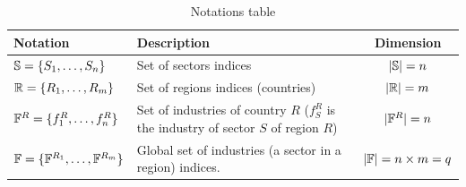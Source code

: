 {\renewcommand{\arraystretch}{1.3}%

  \begin{table}[H]
    \centering
    \caption{Notations table}
    \begin{tabularx}{\linewidth}{
      p{4.5cm}Xc
      }
      \textbf{Notation} & \textbf{Description} & \textbf{Dimension} \\\toprule
      $\mathbb{S}{} = \{ S_1, \ldots, S_n\}$ & Set of sectors indices & $|\mathbb{S}| = n$ \\
      $\mathbb{R} = \{ R_1, \ldots, R_m\}$ & Set of regions indices (countries) & $|\mathbb{R}| = m$ \\
      $\rfirmsset = \{f^R_1, \ldots,  f^R_n\}$ & Set of industries of country $R$ ($f^R_{S}$ is the industry of sector $S$ of region $R$) & $|\rfirmsset{}| = n$\\
      $\firmsset = \{\rfirmsset[R_1], \ldots, \rfirmsset[R_{m}]\}$ & Global set
                                                                     of
                                                                     industries
                                                                     (a sector
                                                                     in a
                                                                     region)
                                                                     indices. &
                                                                                 $|\mathbb{F}|
                                                                                 =
                                                                                 n
                                                                                 \times
                                                                                 m
                                                                                 =
                                                                                 q$\\

\end{tabularx}
\end{table}}
